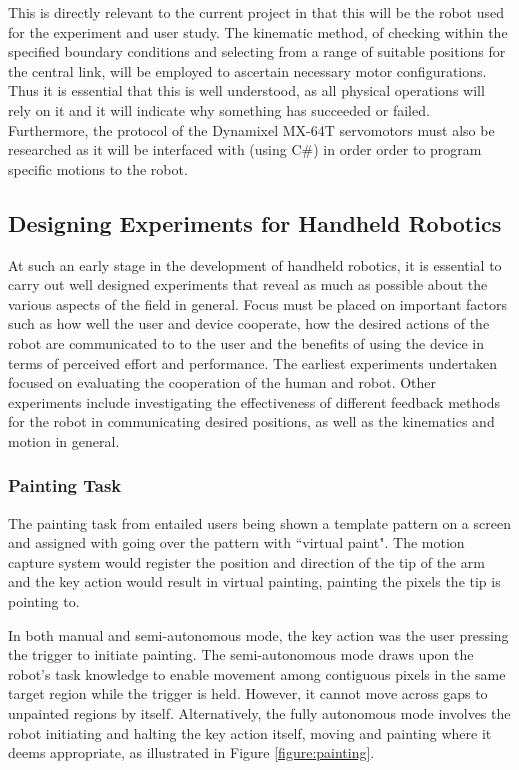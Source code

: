 \documentclass[11pt]{article}
\begin{document}
This is directly relevant to the current project in that this will be the robot used for the experiment and user study. The kinematic method, of checking within the specified boundary conditions and selecting from a range of suitable positions for the central link, will be employed to ascertain necessary motor configurations. Thus it is essential that this is well understood, as all physical operations will rely on it and it will indicate why something has succeeded or failed. Furthermore, the protocol of the Dynamixel MX-64T servomotors \cite{DYNAMIXEL} must also be researched as it will be interfaced with (using C\#) in order order to program specific motions to the robot.

\subsection{Designing Experiments for Handheld Robotics} \label{designingexperiments}
At such an early stage in the development of handheld robotics, it is essential to carry out well designed experiments that reveal as much as possible about the various aspects of the field in general. Focus must be placed on important factors such as how well the user and device cooperate, how the desired actions of the robot are communicated to to the user and the benefits of using the device in terms of perceived effort and performance. The earliest experiments undertaken focused on evaluating the cooperation of the human and robot. Other experiments include investigating the effectiveness of different feedback methods for the robot in communicating desired positions, as well as the kinematics and motion in general.

\subsubsection{Painting Task}
The painting task from \cite{GreggSmithDesign} entailed users being shown a template pattern on a screen and assigned with going over the pattern with ``virtual paint". The motion capture system would register the position and direction of the tip of the arm and the key action would result in virtual painting, painting the pixels the tip is pointing to. 

In both manual and semi-autonomous mode, the key action was the user pressing the trigger to initiate painting. The semi-autonomous mode draws upon the robot's task knowledge to enable movement among contiguous pixels in the same target region while the trigger is held. However, it cannot move across gaps to unpainted regions by itself. Alternatively, the fully autonomous mode involves the robot initiating and halting the key action itself, moving and painting where it deems appropriate, as illustrated in Figure \ref{figure:painting}.
\end{document}
